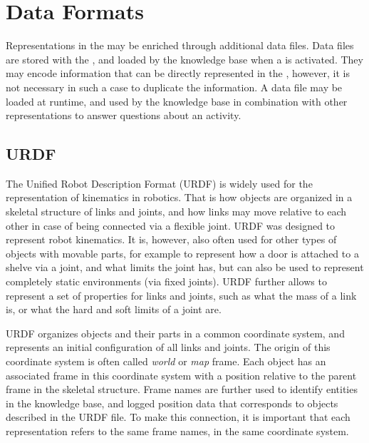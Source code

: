 \section{Data Formats}
\label{sec:background:formats}

Representations in the \neembak may be enriched through additional data files.
Data files are stored with the \neembak, and loaded by the \ease knowledge base when a \neem is activated.
They may encode information that can be directly represented in the \neem, however, it is not necessary in such a case to duplicate the information.
A data file may be loaded at runtime, and used by the knowledge base in combination with other representations to answer questions about an activity.

\subsection{URDF}
\label{sec:background:urdf}

The Unified Robot Description Format (URDF) is widely used for the representation of kinematics in robotics. That is how objects are organized in a skeletal structure of links and joints, and how links may move relative to each other in case of being connected via a flexible joint.
URDF was designed to represent robot kinematics.
It is, however, also often used for other types of objects with movable parts, for example to represent how a door is attached to a shelve via a joint, and what limits the joint has, but can also be used to represent completely static environments (via fixed joints).
URDF further allows to represent a set of properties for links and joints, such as what the mass of a link is, or what the hard and soft limits of a joint are.

URDF organizes objects and their parts in a common coordinate system, and represents an initial configuration of all links and joints.
The origin of this coordinate system is often called \emph{world} or \emph{map} frame.
Each object has an associated frame in this coordinate system with a position relative to the parent frame in the skeletal structure.
Frame names are further used to identify entities in the knowledge base, and logged position data that corresponds to objects described in the URDF file.
To make this connection, it is important that each representation refers to the same frame names, in the same coordinate system.

